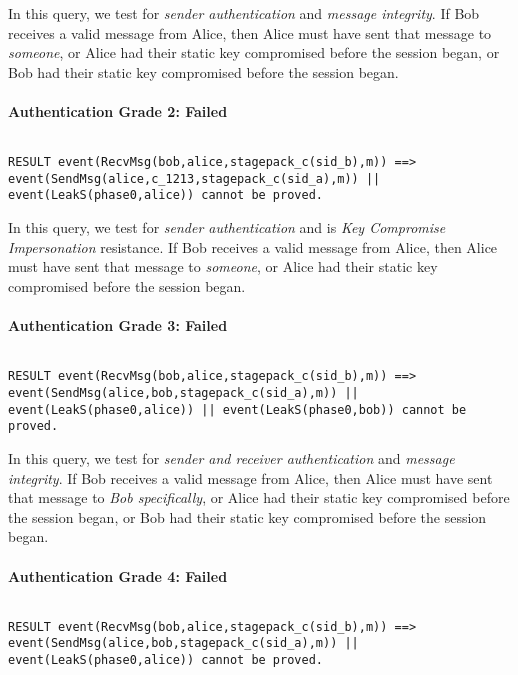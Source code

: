 In this query, we test for \emph{sender authentication} and \emph{message integrity}. If Bob receives a valid message from Alice, then Alice must have sent that message to \emph{someone}, or Alice had their static key compromised before the session began, or Bob had their static key compromised before the session began.


\paragraph{Authentication Grade 2: Failed}$ $
\begin{lstlisting}
RESULT event(RecvMsg(bob,alice,stagepack_c(sid_b),m)) ==> event(SendMsg(alice,c_1213,stagepack_c(sid_a),m)) || event(LeakS(phase0,alice)) cannot be proved.
\end{lstlisting}

In this query, we test for \emph{sender authentication} and is \emph{Key Compromise Impersonation} resistance. If Bob receives a valid message from Alice, then Alice must have sent that message to \emph{someone}, or Alice had their static key compromised before the session began.


\paragraph{Authentication Grade 3: Failed}$ $
\begin{lstlisting}
RESULT event(RecvMsg(bob,alice,stagepack_c(sid_b),m)) ==> event(SendMsg(alice,bob,stagepack_c(sid_a),m)) || event(LeakS(phase0,alice)) || event(LeakS(phase0,bob)) cannot be proved.
\end{lstlisting}

In this query, we test for \emph{sender and receiver authentication} and \emph{message integrity}. If Bob receives a valid message from Alice, then Alice must have sent that message to \emph{Bob specifically}, or Alice had their static key compromised before the session began, or Bob had their static key compromised before the session began.


\paragraph{Authentication Grade 4: Failed}$ $
\begin{lstlisting}
RESULT event(RecvMsg(bob,alice,stagepack_c(sid_b),m)) ==> event(SendMsg(alice,bob,stagepack_c(sid_a),m)) || event(LeakS(phase0,alice)) cannot be proved.
\end{lstlisting}

